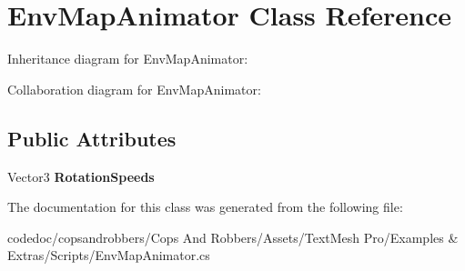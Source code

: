 \hypertarget{classEnvMapAnimator}{}\section{Env\+Map\+Animator Class Reference}
\label{classEnvMapAnimator}


Inheritance diagram for Env\+Map\+Animator\+:


Collaboration diagram for Env\+Map\+Animator\+:
\subsection*{Public Attributes}
\begin{DoxyCompactItemize}
\item 
\mbox{\label{classEnvMapAnimator_a0e8af1e7df113e4ca34b2ffbb6a603e7}} 
Vector3 {\bfseries Rotation\+Speeds}
\end{DoxyCompactItemize}


The documentation for this class was generated from the following file\+:\begin{DoxyCompactItemize}
\item 
codedoc/copsandrobbers/\+Cops And Robbers/\+Assets/\+Text\+Mesh Pro/\+Examples \& Extras/\+Scripts/Env\+Map\+Animator.\+cs\end{DoxyCompactItemize}
